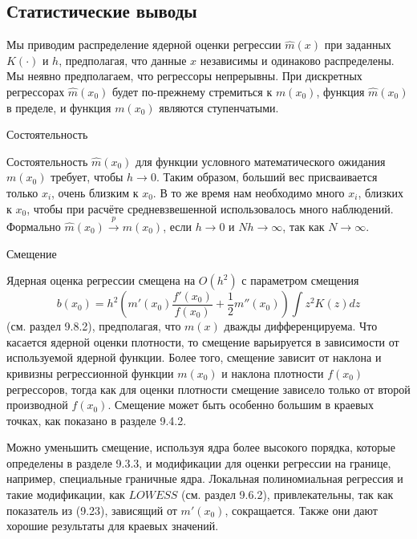 \subsection{Статистические выводы}

Мы приводим распределение ядерной оценки регрессии $\hat{m}(x)$ при заданных $K(\cdot)$ и $h$, предполагая, что данные $x$ независимы и одинаково распределены. Мы неявно предполагаем, что регрессоры непрерывны. При дискретных регрессорах $\hat{m}(x_0)$ будет по-прежнему стремиться к $m(x_0)$, функция $\hat{m}(x_0)$ в пределе, и функция $m(x_0)$ являются ступенчатыми.

\begin{center}
Состоятельность
\end{center}

Состоятельность $\hat{m}(x_0)$ для функции условного математического ожидания $m(x_0)$ требует, чтобы $h \rightarrow 0$. Таким образом, больший вес присваивается только $x_i$, очень близким к $x_0$. В то же время нам необходимо много $x_i$, близких к $x_0$, чтобы при расчёте средневзвешенной использовалось много наблюдений. Формально $\hat{m}(x_0) \stackrel{p}{\rightarrow} m(x_0)$, если $h \rightarrow 0$ и $Nh \rightarrow \infty$, так как $N \rightarrow \infty$.

\begin{center}
Смещение
\end{center}

Ядерная оценка регрессии смещена на $O(h^2)$ с параметром смещения
\begin{equation}
b(x_0) = h^2 \left( m'(x_0)\frac{f'(x_0)}{f(x_0)} + \frac{1}{2} m''(x_0) \right) \int z^2K(z)dz
\end{equation}
(см. раздел 9.8.2), предполагая, что $m(x)$ дважды дифференцируема. Что касается ядерной оценки плотности, то смещение варьируется в зависимости от используемой ядерной функции. Более того, смещение зависит от наклона и кривизны регрессионной функции $m(x_0)$ и наклона плотности $f(x_0)$ регрессоров, тогда как для оценки плотности смещение зависело только от второй производной $f(x_0)$. Смещение может быть особенно большим в краевых точках, как показано в разделе 9.4.2.

Можно уменьшить смещение, используя ядра более высокого порядка, которые определены в разделе 9.3.3, и модификации для оценки регрессии на границе, например, специальные граничные ядра. Локальная полиномиальная регрессия и такие модификации, как $LOWESS$ (см. раздел 9.6.2), привлекательны, так как показатель из (9.23), зависящий от $m'(x_0)$, сокращается. Также они дают хорошие результаты для краевых значений.

